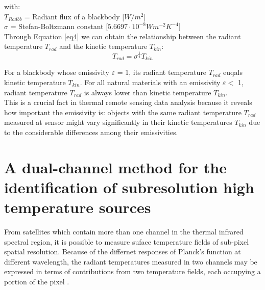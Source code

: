 \noindent with:\\
\indent $T_{Radbb}$ = Radiant flux of a blackbody [$W/m^2$]\\
\indent $\sigma$ = Stefan-Boltzmann constant [$5.6697 \cdot 10^{-8} W m^{-2} K^{-4}$]\\

\noindent Through Equation \eqref{eq4} we can obtain the relationship between the radiant temperature $T_{rad}$ and the kinetic temperature $T_{kin}$:\\
\begin{equation}
\label{eq5}
T_{rad} = \sigma ^{\frac{1}{4}} T_{kin}
\end{equation}

\noindent For a blackbody whose emissivity $\varepsilon$ = 1, its radiant temperature $T_{rad}$ euqals kinetic temperature $T_{kin}$. For all natural materials with an emissivity $\varepsilon <$ 1, radiant temperature $T_{rad}$ is always lower than kinetic temperature $T_{kin}$.\\

\noindent This is a crucial fact in thermal remote sensing data analysis because it reveals how important the emissivity is: objects with the same radiant temperature $T_{rad}$ measured at sensor might vary significantly in their kinetic temperatures $T_{kin}$ due to the considerable differences among their emissivities.\\


\section{A dual-channel method for the identification of subresolution high temperature sources}
From satellites which contain more than one channel in the thermal infrared spectral region, it is possible to measure suface temperature fields of sub-pixel spatial resolution. Because of the differnet responses of Planck's function at different wavelength, the radiant temperatures measured in two channels may be expressed in terms of contributions from two temperature fields, each occupying a portion of the pixel \parencite{Reference210, Reference211}.

